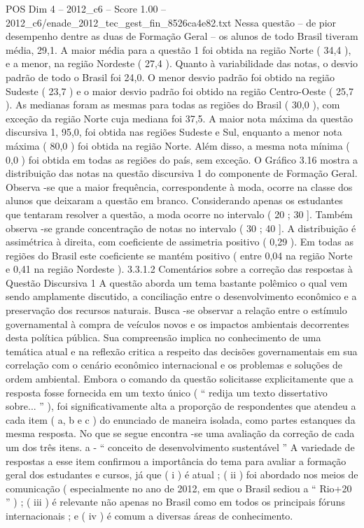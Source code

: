 \begin{textsample}{POS Dim 4 – 2012\_c6 – Score 1.00 – 2012\_c6/enade\_2012\_tec\_gest\_fin\_8526ca4e82.txt}
Nessa questão – de pior desempenho dentre as duas de Formação Geral – os alunos de todo Brasil tiveram média, 29,1.
A maior média para a questão 1 foi obtida na região Norte ( 34,4 ), e a menor, na região Nordeste ( 27,4 ).
Quanto à variabilidade das notas, o desvio padrão de todo o Brasil foi 24,0.
O menor desvio padrão foi obtido na região Sudeste ( 23,7 ) e o maior desvio padrão foi obtido na região Centro-Oeste ( 25,7 ).
As medianas foram as mesmas para todas as regiões do Brasil ( 30,0 ), com exceção da região Norte cuja mediana foi 37,5.
A maior nota máxima da questão discursiva 1, 95,0, foi obtida nas regiões Sudeste e Sul, enquanto a menor nota máxima ( 80,0 ) foi obtida na região Norte.
Além disso, a mesma nota mínima ( 0,0 ) foi obtida em todas as regiões do país, sem exceção.
O Gráfico 3.16 mostra a distribuição das notas na questão discursiva 1 do componente de Formação Geral.
Observa -se que a maior frequência, correspondente à moda, ocorre na classe dos alunos que deixaram a questão em branco.
Considerando apenas os estudantes que tentaram resolver a questão, a moda ocorre no intervalo ( 20 ; 30 ].
Também observa -se grande concentração de notas no intervalo ( 30 ; 40 ].
A distribuição é assimétrica à direita, com coeficiente de assimetria positivo ( 0,29 ).
Em todas as regiões do Brasil este coeficiente se mantém positivo ( entre 0,04 na região Norte e 0,41 na região Nordeste ). 3.3.1.2 Comentários sobre a correção das respostas à Questão Discursiva 1 A questão aborda um tema bastante polêmico o qual vem sendo amplamente discutido, a conciliação entre o desenvolvimento econômico e a preservação dos recursos naturais.
Busca -se observar a relação entre o estímulo governamental à compra de veículos novos e os impactos ambientais decorrentes desta política pública.
Sua compreensão implica no conhecimento de uma temática atual e na reflexão critica a respeito das decisões governamentais em sua correlação com o cenário econômico internacional e os problemas e soluções de ordem ambiental.
Embora o comando da questão solicitasse explicitamente que a resposta fosse fornecida em um texto único ( “ redija um texto dissertativo sobre... ” ), foi significativamente alta a proporção de respondentes que atendeu a cada item ( a, b e c ) do enunciado de maneira isolada, como partes estanques da mesma resposta.
No que se segue encontra -se uma avaliação da correção de cada um dos três itens. a - “ conceito de desenvolvimento sustentável ” A variedade de respostas a esse item confirmou a importância do tema para avaliar a formação geral dos estudantes e cursos, já que ( i ) é atual ; ( ii ) foi abordado nos meios de comunicação ( especialmente no ano de 2012, em que o Brasil sediou a “ Rio+20 ” ) ; ( iii ) é relevante não apenas no Brasil como em todos os principais fóruns internacionais ; e ( iv ) é comum a diversas áreas de conhecimento.

\end{textsample}
